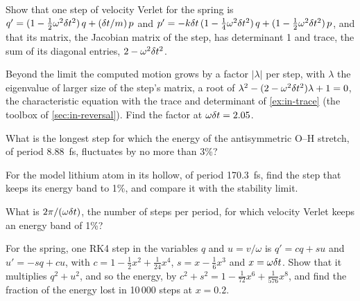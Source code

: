 \begin{exercise}
\label{ex:in-trace}
Show that one step of velocity Verlet for the spring is $q' = (1 -
\frac12\omega^2\delta t^2)\,q + (\delta t/m)\,p$ and $p' = -k\delta t\,(1 - \frac14
\omega^2\delta t^2)\,q + (1 - \frac12\omega^2\delta t^2)\,p$, and that its matrix,
the Jacobian matrix of the step, has determinant 1 and trace, the sum of
its diagonal entries, $2 - \omega^2\delta t^2$.
\end{exercise}

\begin{exercise}
\label{ex:in-growth}
Beyond the limit the computed motion grows by a factor $\lvert\lambda
\rvert$ per step, with $\lambda$ the eigenvalue of larger size of the
step's matrix, a root of $\lambda^2 - (2 - \omega^2\delta t^2)\lambda + 1 = 0$,
the characteristic equation with the trace and determinant of
\cref{ex:in-trace} (the toolbox of \cref{sec:in-reversal}). Find the
factor at $\omega\delta t = 2.05$.
\end{exercise}

\begin{exercise}
\label{ex:in-water}
What is the longest step for which the energy of the antisymmetric O--H
stretch, of period \SI{8.88}{\femto\second}, fluctuates by no more than 3\%?
\end{exercise}

\begin{exercise}
\label{ex:in-lithium}
For the model lithium atom in its hollow, of period
\SI{170.3}{\femto\second}, find the step that keeps its energy band to
1\%, and compare it with the stability limit.
\end{exercise}

\begin{exercise}
\label{ex:in-per-period}
What is $2\pi/(\omega\delta t)$, the number of steps per period, for which
velocity Verlet keeps an energy band of 1\%?
\end{exercise}

\begin{exercise}
\label{ex:in-rk4-spring}
For the spring, one RK4 step in the variables $q$ and $u = v/\omega$ is
$q' = cq + su$ and $u' = -sq + cu$, with $c = 1 - \frac12x^2 +
\frac1{24}x^4$, $s = x - \frac16x^3$ and $x = \omega\delta t$. Show that it
multiplies $q^2 + u^2$, and so the energy, by $c^2 + s^2 = 1 -
\frac1{72}x^6 + \frac1{576}x^8$, and find the fraction of the energy lost
in 10\,000 steps at $x = 0.2$.
\end{exercise}

